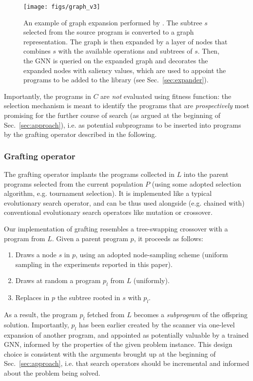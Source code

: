 \begin{figure}[t]
    \centering
    \texttt{[image: figs/graph\_v3]}%
    \caption{An example of graph expansion performed by \mname. The subtree $s$ selected from the source program is converted to a graph representation. The graph is then expanded by a layer of nodes that combines $s$ with the available operations and subtrees of $s$. Then, the GNN is queried on the expanded graph and decorates the expanded nodes with saliency values, which are used to appoint the programs to be added to the library (see Sec.\ \ref{sec:expander}). }
    \label{fig:graph-example}
\end{figure}


Importantly, the programs in $C$ are \emph{not} evaluated using fitness function: the selection mechanism is meant to identify the programs that are \emph{prospectively} most promising for the further course of search (as argued at the beginning of Sec.\ \ref{sec:approach}), i.e. as potential subprograms to be inserted into programs by the grafting operator described in the following.  

\subsubsection{Grafting operator}\label{sec:grafting}
The grafting operator implants the programs collected in $L$ into the parent programs selected from the current population $P$ (using some adopted selection algorithm, e.g. tournament selection). It is implemented like a typical evolutionary search operator, and can be thus used alongside (e.g. chained with) conventional evolutionary search operators like mutation or crossover.  

Our implementation of grafting resembles a tree-swapping crossover with a program from $L$. Given a parent program $p$, it proceeds as follows:
\begin{enumerate}
    \item Draws a node $s$ in $p$, using an adopted node-sampling scheme (uniform sampling in the experiments reported in this paper). 
    \item Draws at random a program $p_l$ from $L$ (uniformly). 
    \item Replaces in $p$ the subtree rooted in $s$ with $p_l$.  
\end{enumerate}
As a result, the program $p_l$ fetched from $L$ becomes a \emph{subprogram} of the offspring solution. Importantly, $p_l$ has been earlier created by the scanner via one-level expansion of another program, and appointed as potentially valuable by a trained GNN, informed by the properties of the given problem instance. This design choice is consistent with the arguments brought up at the beginning of Sec.\ \ref{sec:approach}, i.e. that search operators should be incremental and informed about the problem being solved.   



